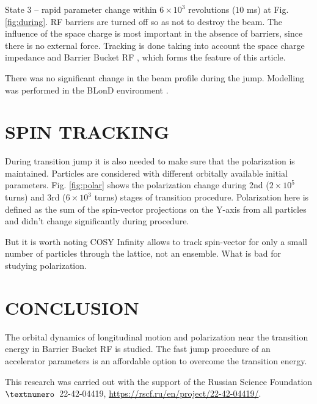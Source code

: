 \documentclass[
aps,%
12pt,%
final,%
notitlepage,%
oneside,%
onecolumn,%
nobibnotes,%
nofootinbib,%
superscriptaddress,%
noshowpacs,%
centertags]%
{revtex4}
\begin{document}
\par State 3 -- rapid parameter change within $6\times{10}^3$ revolutions ($10$ ms) at Fig. \ref{fig:during}. RF barriers are turned off so as not to destroy the beam. The influence of the space charge is most important in the absence of barriers, since there is no external force. Tracking is done taking into account the space charge impedance \cite{weilee} and Barrier Bucket RF \cite{bb}, which forms the feature of this article.

\par There was no significant change in the beam profile during the jump. Modelling was performed in the BLonD environment \cite{blond1, blond}.

\section{SPIN TRACKING}

\par During transition jump it is also needed to make sure that the polarization is maintained.
Particles are considered with different orbitally available initial parameters. Fig. \ref{fig:polar} shows the polarization change during 2nd ($2\times10^5$ turns) and 3rd ($6\times10^3$ turns) stages of transition procedure. Polarization here is defined as the sum of the spin-vector projections on the Y-axis from all particles and didn't change significantly during procedure.
\par But it is worth noting COSY Infinity \cite{cosy} allows to track spin-vector for only a small number of particles through the lattice, not an ensemble. What is bad for studying polarization.

\section{CONCLUSION}

\par The orbital dynamics of longitudinal motion and polarization near the transition energy in Barrier Bucket RF is studied. The fast jump procedure of an accelerator parameters is an affordable option to overcome the transition energy.

\begin{acknowledgements}
This research was carried out with the support of the Russian Science Foundation $\textnumero$~22-42-04419, \url{https://rscf.ru/en/project/22-42-04419/}.
\end{acknowledgements}
\end{document}
